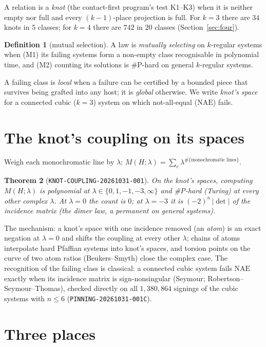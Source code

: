 \documentclass[11pt]{article}
\newtheorem{theorem}{Theorem}
\theoremstyle{definition}
\newtheorem{definition}[theorem]{Definition}
\newcommand{\NAE}{\mathrm{NAE}}
\begin{document}
A relation is a \emph{knot} (the contact-first program's test K1--K3) when it is neither empty nor full and every $(k-1)$-place projection
is full. For $k=3$ there are $34$ knots in $5$ classes; for $k=4$ there are $742$ in $20$ classes (Section~\ref{sec:four}).

\begin{definition}[mutual selection]
A law is \emph{mutually selecting} on $k$-regular systems when
(M1) its failing systems form a non-empty class recognisable in polynomial time, and
(M2) counting its solutions is \#P-hard on general $k$-regular systems.
\end{definition}

A failing class is \emph{local} when a failure can be certified by a bounded piece that survives being grafted into any host; it is
\emph{global} otherwise. We write \emph{knot's space} for a connected cubic ($k=3$) system on which not-all-equal ($\NAE$) fails.

\section{The knot's coupling on its spaces}\label{sec:coupling}

Weigh each monochromatic line by $\lambda$: $M(H;\lambda)=\sum_c\lambda^{\#\{\text{monochromatic lines}\}}$.

\begin{theorem}[\texttt{KNOT-COUPLING-20261031-001}]\label{thm:coupling}
On the knot's spaces, computing $M(H;\lambda)$ is polynomial at $\lambda\in\{0,1,-1,-3,\infty\}$ and \#P-hard (Turing) at every other
complex $\lambda$. At $\lambda=0$ the count is $0$; at $\lambda=-3$ it is $(-2)^n\,|\det|$ of the incidence matrix (the \emph{dimer law},
a permanent on general systems).
\end{theorem}

The mechanism: a knot's space with one incidence removed (an \emph{atom}) is an exact negation at $\lambda=0$ and shifts the coupling at
every other $\lambda$; chains of atoms interpolate hard Pfaffian systems into knot's spaces, and torsion points on the curve of two atom
ratios (Beukers--Smyth) close the complex case. The recognition of the failing class is classical: a connected cubic system fails $\NAE$
exactly when its incidence matrix is sign-nonsingular (Seymour; Robertson--Seymour--Thomas), checked directly on all
$1{,}380{,}864$ signings of the cubic systems with $n\le 6$ (\texttt{PINNING-20261031-001C}).

\section{Three places}\label{sec:three}
\end{document}

